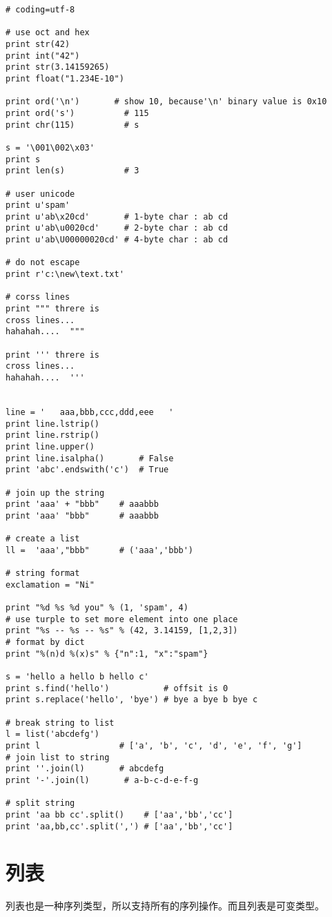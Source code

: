 \begin{lstlisting}
# coding=utf-8

# use oct and hex
print str(42)
print int("42")
print str(3.14159265)
print float("1.234E-10")

print ord('\n')       # show 10, because'\n' binary value is 0x10
print ord('s')          # 115
print chr(115)          # s

s = '\001\002\x03'
print s
print len(s)            # 3

# user unicode
print u'spam'
print u'ab\x20cd'       # 1-byte char : ab cd
print u'ab\u0020cd'     # 2-byte char : ab cd
print u'ab\U00000020cd' # 4-byte char : ab cd

# do not escape
print r'c:\new\text.txt'

# corss lines 
print """ threre is 
cross lines...
hahahah....  """

print ''' threre is 
cross lines...
hahahah....  '''


line = '   aaa,bbb,ccc,ddd,eee   '
print line.lstrip()
print line.rstrip()
print line.upper()
print line.isalpha()       # False
print 'abc'.endswith('c')  # True

# join up the string
print 'aaa' + "bbb"    # aaabbb
print 'aaa' "bbb"      # aaabbb

# create a list
ll =  'aaa',"bbb"      # ('aaa','bbb')

# string format
exclamation = "Ni"

print "%d %s %d you" % (1, 'spam', 4)
# use turple to set more element into one place
print "%s -- %s -- %s" % (42, 3.14159, [1,2,3])
# format by dict
print "%(n)d %(x)s" % {"n":1, "x":"spam"}

s = 'hello a hello b hello c'
print s.find('hello')           # offsit is 0
print s.replace('hello', 'bye') # bye a bye b bye c

# break string to list
l = list('abcdefg') 
print l                # ['a', 'b', 'c', 'd', 'e', 'f', 'g']
# join list to string
print ''.join(l)       # abcdefg
print '-'.join(l)       # a-b-c-d-e-f-g

# split string
print 'aa bb cc'.split()    # ['aa','bb','cc']
print 'aa,bb,cc'.split(',') # ['aa','bb','cc']
\end{lstlisting}

\section{列表}

列表也是一种序列类型，所以支持所有的序列操作。而且列表是可变类型。

